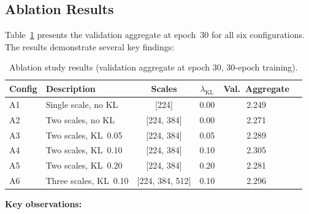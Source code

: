 \subsection{Ablation Results}

Table~\ref{tab:ablation_results} presents the validation aggregate at epoch~30 for all
six configurations. The results demonstrate several key findings:

\begin{table}[h]
    \centering
    \caption{Ablation study results (validation aggregate at epoch 30, 30-epoch training).}
    \label{tab:ablation_results}
    \begin{tabular}{llcccc}
        \toprule
        Config & Description & Scales & $\lambda_{\text{KL}}$ & Val.\ Aggregate \\
        \midrule
        A1 & Single scale, no KL   & [224]        & 0.00 & 2.249 \\
        A2 & Two scales, no KL     & [224, 384]   & 0.00 & 2.271 \\
        A3 & Two scales, KL~0.05   & [224, 384]   & 0.05 & 2.289 \\
        A4 & Two scales, KL~0.10   & [224, 384]   & 0.10 & 2.305 \\
        A5 & Two scales, KL~0.20   & [224, 384]   & 0.20 & 2.281 \\
        A6 & Three scales, KL~0.10 & [224, 384, 512] & 0.10 & 2.296 \\
        \bottomrule
    \end{tabular}
\end{table}

\textbf{Key observations:}

